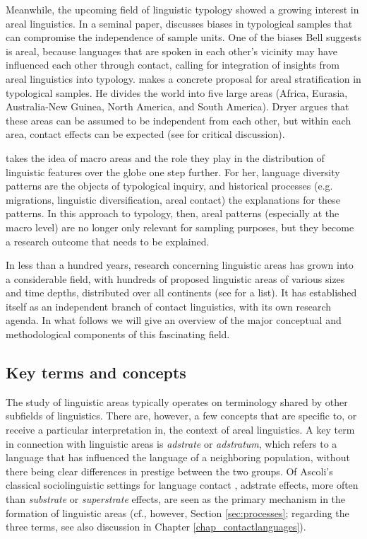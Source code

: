 \documentclass[output=paper]{langscibook}
\begin{document}
Meanwhile, the upcoming field of linguistic typology showed a growing interest in areal linguistics. In a seminal paper, \textcite{Bell1978Language} discusses biases in typological samples that can compromise the independence of sample units.
One of the biases Bell suggests is areal, because languages that are spoken in each other's vicinity may have influenced each other through contact, calling for integration of insights from areal linguistics into typology. \textcite{Dryer1989Large} makes a concrete proposal for areal stratification in typological samples. He divides the world into five large areas (Africa, Eurasia, Australia-New Guinea, North America, and South America). Dryer argues that these areas can be assumed to be independent from each other, but within each area, contact effects can be expected (see \cite{hammarstrometal2014some} for critical discussion). 

\textcite{Nichols1992Linguistic} takes the idea of macro areas and the role they play in the distribution of linguistic features over the globe one step further. For her, language diversity patterns are the objects of typological inquiry, and historical processes (e.g. migrations, linguistic diversification, areal contact) the explanations for these patterns.
In this approach to typology, then, areal patterns (especially at the macro level) are no longer only relevant for sampling purposes, but they become a research outcome that needs to be explained. 

In less than a hundred years, research concerning linguistic areas has grown into a considerable field, with hundreds of proposed linguistic areas of various sizes and time depths, distributed over all continents (see \citealt{campbell2017why} for a list). It has established itself as an independent branch of contact linguistics, with its own research agenda. In what follows we will give an overview of the major conceptual and methodological components of this fascinating field.

\subsection{Key terms and concepts}

The study of linguistic areas typically operates on terminology shared by other subfields of linguistics. There are, however, a few concepts that are specific to, or receive a particular interpretation in, the context of areal linguistics. A key term in connection with linguistic areas is \textit{adstrate} or \textit{adstratum}, which refers to a language that has influenced the language of a neighboring population, without there being clear differences in prestige between the two groups. Of Ascoli's classical sociolinguistic settings for language contact \parencite[see][195--96]{tristram2007don}, adstrate effects, more often than \textit{substrate} or \textit{superstrate} effects, are seen as the primary mechanism in the formation of linguistic areas (cf., however, Section \ref{sec:processes}; regarding the three terms, see also discussion in Chapter \ref{chap_contactlanguages}).
\end{document}
